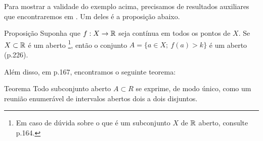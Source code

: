 	Para mostrar a validade do exemplo acima, precisamos de resultados auxiliares que encontraremos em \cite{elon}.
	Um deles é a proposição abaixo.
	\vspace{-0.2cm}
\begin{env}{Proposição}
\label{cit:função-continua-mensuravel}
	Suponha que $f:X \to \mathbb{R}$ seja contínua em todos os pontos de $X$.
	Se $X \subset \mathbb{R}$ é um aberto
	\footnote{Em caso de dúvida sobre o que é um subconjunto $X$ de $\mathbb{R}$ aberto, consulte \supercite{elon}{p.164}.}, então o conjunto $A = \{a \in X;\ f(a)>k\}$ é um aberto (p.226).
	\vspace{-0.2cm}
\end{env}
	Além disso, em \supercite{elon}{p.167}, encontramos o seguinte teorema:
	\begin{env}{Teorema}
		\label{teo:estrutura-abertos-reta}
		Todo subconjunto aberto $A \subset R$ se exprime, de modo único, como um reunião enumerável de intervalos abertos dois a dois disjuntos.
		\vspace{-0.2cm}
	\end{env}

